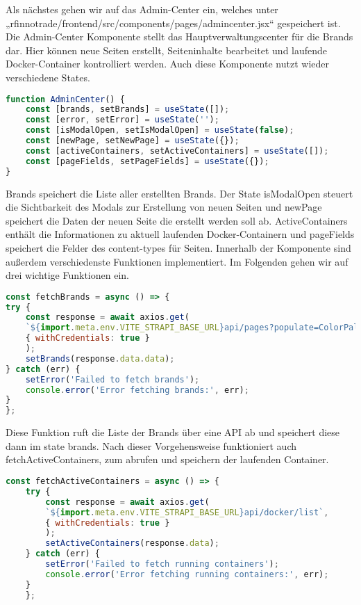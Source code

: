 Als nächstes gehen wir auf das Admin-Center ein, welches unter „rfinnotrade/frontend/src/components/pages/admincenter.jsx“ gespeichert ist. Die Admin-Center Komponente stellt das Hauptverwaltungscenter für die Brands dar. Hier können neue Seiten erstellt, Seiteninhalte bearbeitet und laufende Docker-Container kontrolliert werden.
Auch diese Komponente nutzt wieder verschiedene States.

\begin{lstlisting}[language=JavaScript, caption={AdminCenter.jsx states}, label={lst:admincenterjsxStates}]
function AdminCenter() {
    const [brands, setBrands] = useState([]);
    const [error, setError] = useState('');
    const [isModalOpen, setIsModalOpen] = useState(false);
    const [newPage, setNewPage] = useState({});
    const [activeContainers, setActiveContainers] = useState([]);
    const [pageFields, setPageFields] = useState({});
}
\end{lstlisting}

Brands speichert die Liste aller erstellten Brands. Der State isModalOpen steuert die Sichtbarkeit des Modals zur Erstellung von neuen Seiten und newPage speichert die Daten der neuen Seite die erstellt werden soll ab. ActiveContainers enthält die Informationen zu aktuell laufenden Docker-Containern und pageFields speichert die Felder des content-types für Seiten.
Innerhalb der Komponente sind außerdem verschiedenste Funktionen implementiert. Im Folgenden gehen wir auf drei wichtige Funktionen ein.

\begin{lstlisting}[language=JavaScript, caption={fetchBrands-Funktion}, label={lst:admincenterjsxFetchBrandsFunktion}]
const fetchBrands = async () => {
try {
    const response = await axios.get(
    `${import.meta.env.VITE_STRAPI_BASE_URL}api/pages?populate=ColorPalette`, 
    { withCredentials: true }
    );
    setBrands(response.data.data);
} catch (err) {
    setError('Failed to fetch brands');
    console.error('Error fetching brands:', err);
}
};
\end{lstlisting}

Diese Funktion ruft die Liste der Brands über eine API ab und speichert diese dann im state brands. Nach dieser Vorgehensweise funktioniert auch fetchActiveContainers, zum abrufen und speichern der laufenden Container.

\begin{lstlisting}[language=JavaScript, caption={fetchActiveContainers-Funktion}, label={lst:admincenterjsxFetchActiveContainersFunktion}]
const fetchActiveContainers = async () => {
    try {
        const response = await axios.get(
        `${import.meta.env.VITE_STRAPI_BASE_URL}api/docker/list`,
        { withCredentials: true }
        );
        setActiveContainers(response.data);
    } catch (err) {
        setError('Failed to fetch running containers');
        console.error('Error fetching running containers:', err);
    }
    };
\end{lstlisting}

